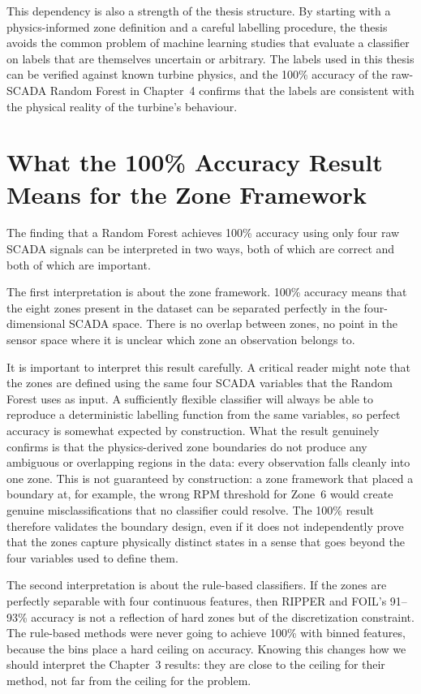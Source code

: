 This dependency is also a strength of the thesis structure. By starting with a
physics-informed zone definition and a careful labelling procedure, the thesis avoids the
common problem of machine learning studies that evaluate a classifier on labels that are
themselves uncertain or arbitrary. The labels used in this thesis can be verified against
known turbine physics, and the 100\% accuracy of the raw-SCADA Random Forest in
Chapter~4 confirms that the labels are consistent with the physical reality of the
turbine's behaviour.

\section{What the 100\% Accuracy Result Means for the Zone Framework}
\label{sec:ch5:rf100}

The finding that a Random Forest achieves 100\% accuracy using only four raw SCADA
signals can be interpreted in two ways, both of which are correct and both of which are
important.

The first interpretation is about the zone framework. 100\% accuracy means that the
eight zones present in the dataset can be separated perfectly in the
four-dimensional SCADA space. There is no overlap between zones, no point in the sensor
space where it is unclear which zone an observation belongs to.

It is important to interpret this result carefully. A critical reader might note that the
zones are defined using the same four SCADA variables that the Random Forest uses as
input. A sufficiently flexible classifier will always be able to reproduce a deterministic
labelling function from the same variables, so perfect accuracy is somewhat expected by
construction. What the result genuinely confirms is that the physics-derived zone
boundaries do not produce any ambiguous or overlapping regions in the data: every
observation falls cleanly into one zone. This is not guaranteed by construction: a
zone framework that placed a boundary at, for example, the wrong RPM threshold for
Zone~6 would create genuine misclassifications that no classifier could resolve. The
100\% result therefore validates the boundary design, even if it does not independently
prove that the zones capture physically distinct states in a sense that goes beyond the
four variables used to define them.

The second interpretation is about the rule-based classifiers. If the zones are perfectly
separable with four continuous features, then RIPPER and FOIL's 91--93\% accuracy is not
a reflection of hard zones but of the discretization constraint. The rule-based methods
were never going to achieve 100\% with binned features, because the bins place a hard
ceiling on accuracy. Knowing this changes how we should interpret the Chapter~3 results:
they are close to the ceiling for their method, not far from the ceiling for the problem.

